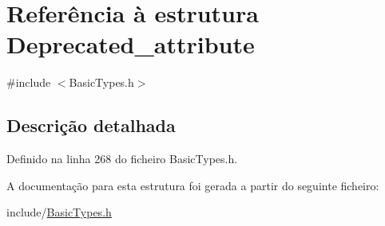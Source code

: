 \hypertarget{structDeprecated__attribute}{}\section{Referência à estrutura Deprecated\+\_\+attribute}
\label{structDeprecated__attribute}


{\ttfamily \#include $<$Basic\+Types.\+h$>$}



\subsection{Descrição detalhada}


Definido na linha 268 do ficheiro Basic\+Types.\+h.



A documentação para esta estrutura foi gerada a partir do seguinte ficheiro\+:\begin{DoxyCompactItemize}
\item 
include/\hyperlink{BasicTypes_8h}{Basic\+Types.\+h}\end{DoxyCompactItemize}
